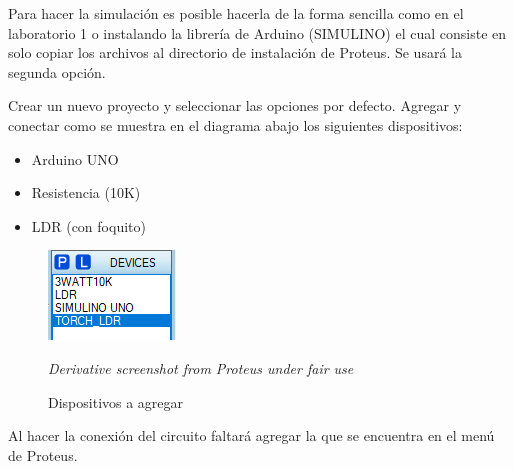 \documentclass{article}
\begin{document}
Para hacer la simulación es posible hacerla de la forma sencilla como en el laboratorio 1 o instalando la librería de Arduino (SIMULINO) el cual consiste en solo copiar los archivos al directorio de instalación de Proteus. Se usará la segunda opción.

\bigbreak

Crear un nuevo proyecto y seleccionar las opciones por defecto. Agregar y conectar como se muestra en el diagrama abajo los siguientes dispositivos:

\begin{itemize}
\item Arduino UNO
\item Resistencia (10K)
\item LDR (con foquito)
\end{itemize}

\begin{figure}[H]
\centering
\includegraphics[width=0.1\paperwidth]{images/proteus-devices.png}
\caption{Dispositivos a agregar}\footnotesize
\textit{Derivative screenshot from Proteus under fair use}
\end{figure}

Al hacer la conexión del circuito faltará agregar la  que se encuentra en el menú  de Proteus.
\end{document}
